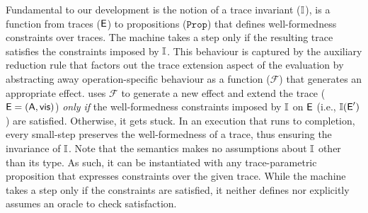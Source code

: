 Fundamental to our development is the notion of a trace invariant
($\mathbb{I}$), is a function from traces ($\textsf{E}$) to propositions
($\texttt{Prop}$) that defines well-formedness constraints over
traces. The machine takes a step only if the resulting trace satisfies
the constraints imposed by $\mathbb{I}$. This behaviour is captured by the
auxiliary reduction rule  that factors out the trace
extension aspect of the evaluation by abstracting away
operation-specific behaviour as a function ($\mathcal{F}$) that
generates an appropriate effect.   uses $\mathcal{F}$
to generate a new effect and extend the trace ($\textsf{E} = (\textsf{A},\textsf{vis})$)
\emph{only if} the well-formedness constraints imposed by $\mathbb{I}$ on $\textsf{E}$
(i.e., $\mathbb{I}(\textsf{E}')$) are satisfied. Otherwise, it gets stuck. In an
execution that runs to completion, every small-step preserves the
well-formedness of a trace, thus ensuring the invariance of $\mathbb{I}$.
Note that the semantics makes no assumptions about $\mathbb{I}$ other than its
type. As such, it can be instantiated with any trace-parametric
proposition that expresses constraints over the given trace. While the
machine takes a step only if the constraints are satisfied, it neither
defines nor explicitly assumes an oracle to check satisfaction.


